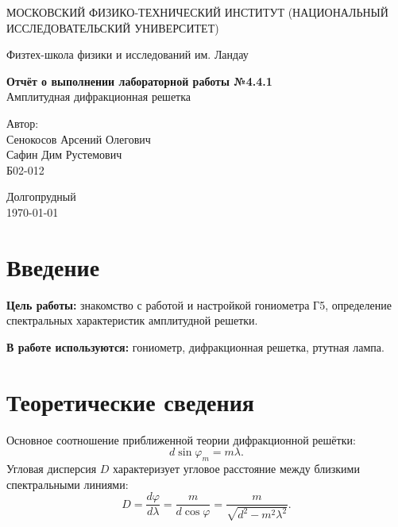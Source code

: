 \documentclass[a4paper,12pt]{article} %
\date{\today}
\begin{document}
\begin{titlepage}
	\begin{center}
		{\large МОСКОВСКИЙ ФИЗИКО-ТЕХНИЧЕСКИЙ ИНСТИТУТ (НАЦИОНАЛЬНЫЙ ИССЛЕДОВАТЕЛЬСКИЙ УНИВЕРСИТЕТ)}
	\end{center}
	\begin{center}
		{\large Физтех-школа физики и исследований им. Ландау}
	\end{center}
	
	
	\vspace{4.5cm}
	{\huge
		\begin{center}
			{\bf Отчёт о выполнении лабораторной работы №4.4.1}\\
			Амплитудная дифракционная решетка
		\end{center}
	}
	\vspace{2cm}
	\begin{flushright}
		{\LARGE Автор:\\ Сенокосов Арсений Олегович \\ Сафин Дим Рустемович \\
			\vspace{0.2cm}
			Б02-012}
	\end{flushright}
	\vspace{8cm}
	\begin{center}
		Долгопрудный\\
		\today
	\end{center}
\end{titlepage}

\section{Введение}

\textbf{Цель работы:} знакомство с работой и настройкой гониометра Г5, определение спектральных характеристик амплитудной решетки.

\textbf{В работе используются:}  гониометр, дифракционная решетка, ртутная лампа.

\section{Теоретические сведения}

\noindent Основное соотношение приближенной теории дифракционной решётки:
	\begin{equation}
	d\sin \varphi_m = m\lambda.
	\end{equation}
	Угловая дисперсия $D$ характеризует угловое расстояние между близкими спектральными линиями:
	\begin{equation}
	D = \frac{d\varphi}{d\lambda} = \frac{m}{d \cos \varphi}=\frac{m}{\sqrt{d^{2}-m^{2} \lambda^{2}}}.
	\end{equation}
	
\end{document}
